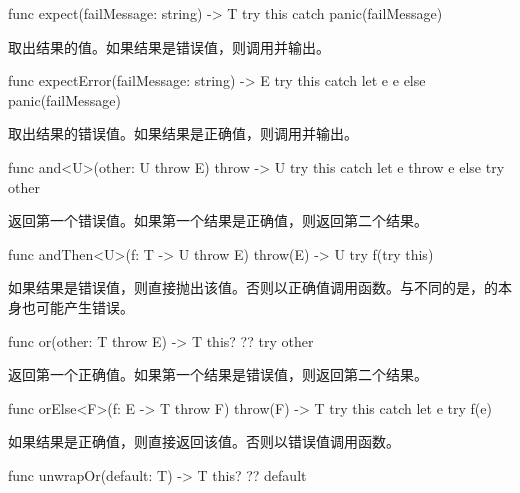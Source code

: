 \begin{itemdecl}
func expect(failMessage: string) -> T {
    try this catch { panic(failMessage) }
}
\end{itemdecl}

\pnum
{}取出结果的值。如果结果是错误值，则调用并输出。

\begin{itemdecl}
func expectError(failMessage: string) -> E {
    try this catch let e { e } else { panic(failMessage) }
}
\end{itemdecl}

\pnum
{}取出结果的错误值。如果结果是正确值，则调用并输出。

\begin{itemdecl}
func and<U>(other: U throw E) throw -> U {
    try this catch let e { throw e } else { try other }
}
\end{itemdecl}

\pnum
{}返回第一个错误值。如果第一个结果是正确值，则返回第二个结果。

\begin{itemdecl}
func andThen<U>(f: T -> U throw E) throw(E) -> U {
    try f(try this)
}
\end{itemdecl}

\pnum
如果结果是错误值，则直接抛出该值。否则以正确值调用函数。\enternote 与不同的是，的本身也可能产生错误。\exitnote

\begin{itemdecl}
func or(other: T throw E) -> T {
    this? ?? try other
}
\end{itemdecl}

\pnum
{}返回第一个正确值。如果第一个结果是错误值，则返回第二个结果。

\begin{itemdecl}
func orElse<F>(f: E -> T throw F) throw(F) -> T {
    try this catch let e { try f(e) }
}
\end{itemdecl}

\pnum
如果结果是正确值，则直接返回该值。否则以错误值调用函数。

\begin{itemdecl}
func unwrapOr(default: T) -> T {
    this? ?? default
}
\end{itemdecl}

